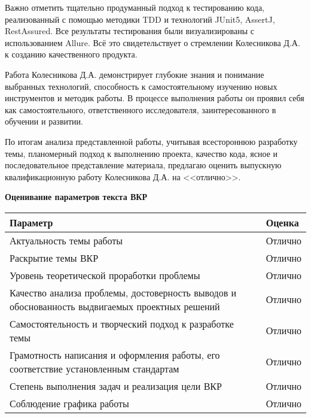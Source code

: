 \documentclass[a4paper,article]{article}
\begin{document}
\begin{sloppypar}
    Важно отметить тщательно продуманный подход к тестированию кода, реализованный с помощью методики TDD и технологий JUnit5, AssertJ, RestAssured. Все результаты тестирования были визуализированы с использованием Allure. Всё это свидетельствует о стремлении Колесникова Д.А. к созданию качественного продукта.
    
    Работа Колесникова Д.А. демонстрирует глубокие знания и понимание выбранных технологий, способность к самостоятельному изучению новых инструментов и методик работы. В процессе выполнения работы он проявил себя как самостоятельного, ответственного исследователя, заинтересованного в обучении и развитии.
    
    По итогам анализа представленной работы, учитывая всестороннюю разработку темы, планомерный подход к выполнению проекта, качество кода, ясное и последовательное представление материала, предлагаю оценить выпускную квалификационную работу Колесникова Д.А. на <<отлично>>. \newline
    
    \textbf{Оценивание параметров текста ВКР}

    \begin{xltabular}{\textwidth} { |
            >{\hsize} X |
            >{\hsize} X | }

        \hline
        \textbf{Параметр} 
        & \textbf{Оценка} \\
        \hline
        Актуальность темы работы
        & Отлично \\
        \hline
        Раскрытие темы ВКР
        & Отлично \\
        \hline
        Уровень теоретической проработки проблемы
        & Отлично \\
        \hline
        Качество анализа проблемы, достоверность выводов и обоснованность выдвигаемых проектных решений
        & Отлично \\
        \hline
        Самостоятельность и творческий подход к разработке темы
        & Отлично \\
        \hline
        Грамотность написания и оформления работы, его соответствие установленным стандартам
        & Отлично \\
        \hline
        Степень выполнения задач и реализация цели ВКР
        & Отлично \\
        \hline
        Соблюдение графика работы
        & Отлично \\
        \hline
    \end{xltabular}


\end{sloppypar}
\end{document}
